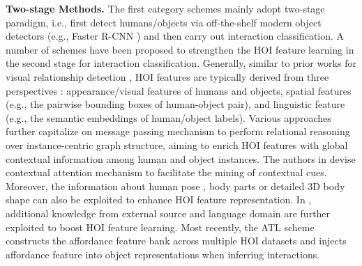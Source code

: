 \documentclass[10pt,twocolumn,letterpaper]{article}
\begin{document}
\textbf{Two-stage Methods.}
The first category schemes \cite{chao2018learning,gao2020drg,gao2018ican,gkioxari2018detecting,hou2021affordance,hou2021detecting,li2020hoi,li2019transferable,liu2020amplifying,liu2020consnet,qi2018learning,ulutan2020vsgnet,wang2020contextual,wang2019deep,zhong2020polysemy,zhang2021mining} mainly adopt two-stage paradigm, i.e., first detect humans/objects via off-the-shelf modern object detectors (e.g., Faster R-CNN \cite{ren2015faster}) and then carry out interaction classification. A number of schemes have been proposed to strengthen the HOI feature learning in the second stage for interaction classification. Generally, similar to prior works for visual relationship detection \cite{li2017vip,mi2020hierarchical,yao2018exploring,zhang2022boosting,zhang2019graphical}, HOI features are typically derived from three perspectives \cite{chao2018learning,gao2018ican,gkioxari2018detecting}: appearance/visual features of humans and objects, spatial features (e.g., the pairwise bounding boxes of human-object pair), and linguistic feature (e.g., the semantic embeddings of human/object labels). Various approaches \cite{gao2020drg,he2021exploiting,qi2018learning,ulutan2020vsgnet,wang2020contextual,zhang2020spatially} further capitalize on message passing mechanism to perform relational reasoning over instance-centric graph structure, aiming to enrich HOI features with global contextual information among human and object instances. The authors in \cite{wang2019deep} devise contextual attention mechanism to facilitate the mining of contextual cues. Moreover, the information about human pose \cite{gupta2019no,li2019transferable,zhong2020polysemy}, body parts \cite{zhou2019relation} or detailed 3D body shape \cite{li2020detailed} can also be exploited to enhance HOI feature representation. In \cite{liu2020consnet,xu2019learning}, additional knowledge from external source and language domain are further exploited to boost HOI feature learning. Most recently, the ATL scheme \cite{hou2021affordance} constructs the affordance feature bank across multiple HOI datasets and injects affordance feature into object representations when inferring interactions.
\end{document}
